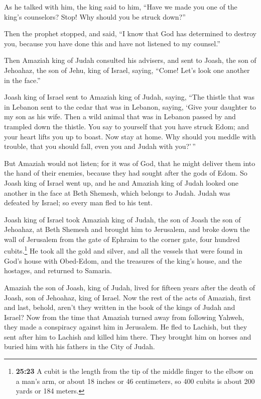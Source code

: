  As he talked with him, the king said to him, ``Have we
made you one of the king's counselors? Stop! Why should you be struck
down?''

Then the prophet stopped, and said, ``I know that God has determined to
destroy you, because you have done this and have not listened to my
counsel.''

 Then Amaziah king of Judah consulted his advisers, and
sent to Joash, the son of Jehoahaz, the son of Jehu, king of Israel,
saying, ``Come! Let's look one another in the face.''

 Joash king of Israel sent to Amaziah king of Judah,
saying, ``The thistle that was in Lebanon sent to the cedar that was in
Lebanon, saying, `Give your daughter to my son as his wife. Then a wild
animal that was in Lebanon passed by and trampled down the thistle.
 You say to yourself that you have struck Edom; and your
heart lifts you up to boast. Now stay at home. Why should you meddle
with trouble, that you should fall, even you and Judah with you?'\,''

 But Amaziah would not listen; for it was of God, that he
might deliver them into the hand of their enemies, because they had
sought after the gods of Edom.  So Joash king of Israel
went up, and he and Amaziah king of Judah looked one another in the face
at Beth Shemesh, which belongs to Judah.  Judah was
defeated by Israel; so every man fled to his tent.

 Joash king of Israel took Amaziah king of Judah, the son
of Joash the son of Jehoahaz, at Beth Shemesh and brought him to
Jerusalem, and broke down the wall of Jerusalem from the gate of Ephraim
to the corner gate, four hundred cubits.\footnote{\textbf{25:23} A cubit
  is the length from the tip of the middle finger to the elbow on a
  man's arm, or about 18 inches or 46 centimeters, so 400 cubits is
  about 200 yards or 184 meters.}  He took all the gold
and silver, and all the vessels that were found in God's house with
Obed-Edom, and the treasures of the king's house, and the hostages, and
returned to Samaria.

 Amaziah the son of Joash, king of Judah, lived for
fifteen years after the death of Joash, son of Jehoahaz, king of Israel.
 Now the rest of the acts of Amaziah, first and last,
behold, aren't they written in the book of the kings of Judah and
Israel?  Now from the time that Amaziah turned away from
following Yahweh, they made a conspiracy against him in Jerusalem. He
fled to Lachish, but they sent after him to Lachish and killed him
there.  They brought him on horses and buried him with
his fathers in the City of Judah.

